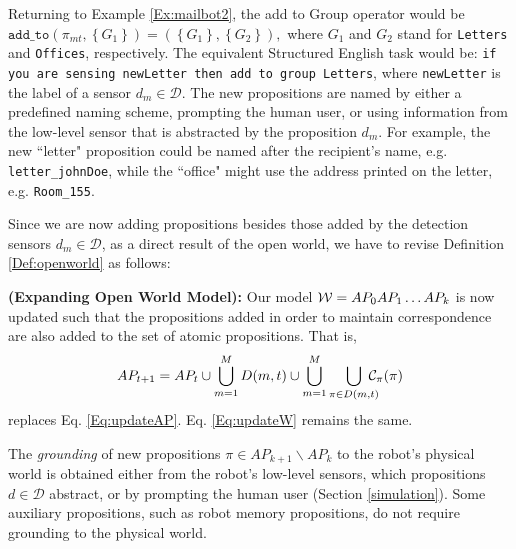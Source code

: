
Returning to Example \ref{Ex:mailbot2}, the add to Group operator would be 
$ \texttt{add\_to}(\pi_{mt}, \left\{ G_1 \right\}) = ( \left\{ G_1 \right\},  \left\{ G_2 \right\}),$
where $G_1$ and $G_2$ stand for \texttt{Letters} and \texttt{Offices}, respectively.
The equivalent Structured English task would be: \texttt{if you are sensing newLetter then add to group Letters}, where \texttt{newLetter} is the label of a sensor $d_m \in \mathcal{D}$. The new propositions are named by either a predefined naming scheme, prompting the human user, or using information from the low-level sensor that is abstracted by the proposition $d_m$. For example, the new ``letter" proposition could be named after the recipient's name, e.g. \texttt{letter\_johnDoe}, while the ``office" might use the address printed on the letter, e.g. \texttt{Room\_155}.

Since we are now adding propositions besides those added by the detection sensors $d_m \in \mathcal{D}$, as a direct result of the open world, we have to revise Definition \ref{Def:openworld} as follows:

\begin{myDefinition}\label{Def:openworld2}
	\textbf{(Expanding Open World Model):} Our model $\mathcal{W} = AP_0 AP_1 \ldots AP_k$ is now updated such that the propositions added in order to maintain correspondence are also added to the set of atomic propositions. That is, 
	\begin{equation}\label{Eq:updateAP2}
		 AP_{t+1} = AP_t \cup \bigcup_{m=1}^{M}D(m, t) \cup \bigcup_{m=1}^{M} \smashoperator[r]{\bigcup_{\pi \in D(m, t)}}~ \mathcal{C}_{\pi}(\pi)
	\end{equation}
	replaces Eq. \eqref{Eq:updateAP}. Eq. \eqref{Eq:updateW} remains the same.
\end{myDefinition}

\begin{myAssumption}\label{Ass:grounding}
	The \emph{grounding} \cite{Grounding2013} of new propositions $\pi \in AP_{k+1} \backslash AP_k$ to the robot's physical world is obtained either from the robot's low-level sensors, which propositions $d \in \mathcal{D}$ abstract, or by prompting the human user (Section \ref{simulation}).
Some auxiliary propositions, such as robot memory propositions, do not require grounding to the physical world.
\end{myAssumption}

